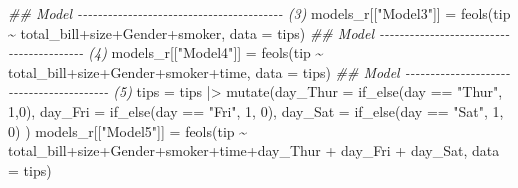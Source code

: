 \documentclass[
  letterpaper,
  DIV=11,
  numbers=noendperiod]{scrreprt}
\newenvironment{Shaded}{\begin{snugshade}}{\end{snugshade}}
\newcommand{\AttributeTok}[1]{\textcolor[rgb]{0.40,0.45,0.13}{#1}}
\newcommand{\DecValTok}[1]{\textcolor[rgb]{0.68,0.00,0.00}{#1}}
\newcommand{\DocumentationTok}[1]{\textcolor[rgb]{0.37,0.37,0.37}{\textit{#1}}}
\newcommand{\FunctionTok}[1]{\textcolor[rgb]{0.28,0.35,0.67}{#1}}
\newcommand{\NormalTok}[1]{\textcolor[rgb]{0.00,0.23,0.31}{#1}}
\newcommand{\OtherTok}[1]{\textcolor[rgb]{0.00,0.23,0.31}{#1}}
\newcommand{\SpecialCharTok}[1]{\textcolor[rgb]{0.37,0.37,0.37}{#1}}
\newcommand{\StringTok}[1]{\textcolor[rgb]{0.13,0.47,0.30}{#1}}
\begin{document}
\begin{Shaded}
\begin{Highlighting}[]
 \DocumentationTok{\#\# Model {-}{-}{-}{-}{-}{-}{-}{-}{-}{-}{-}{-}{-}{-}{-}{-}{-}{-}{-}{-}{-}{-}{-}{-}{-}{-}{-}{-}{-}{-}{-}{-}{-}{-}{-}{-}{-}{-}{-}{-}{-} (3)}
\NormalTok{models\_r[[}\StringTok{"Model3"}\NormalTok{]] }\OtherTok{=} \FunctionTok{feols}\NormalTok{(tip }\SpecialCharTok{\textasciitilde{}}\NormalTok{ total\_bill}\SpecialCharTok{+}\NormalTok{size}\SpecialCharTok{+}\NormalTok{Gender}\SpecialCharTok{+}\NormalTok{smoker, }\AttributeTok{data =}\NormalTok{ tips)}
\DocumentationTok{\#\# Model {-}{-}{-}{-}{-}{-}{-}{-}{-}{-}{-}{-}{-}{-}{-}{-}{-}{-}{-}{-}{-}{-}{-}{-}{-}{-}{-}{-}{-}{-}{-}{-}{-}{-}{-}{-}{-}{-}{-}{-}{-} (4)}
\NormalTok{models\_r[[}\StringTok{"Model4"}\NormalTok{]] }\OtherTok{=} \FunctionTok{feols}\NormalTok{(tip }\SpecialCharTok{\textasciitilde{}}\NormalTok{ total\_bill}\SpecialCharTok{+}\NormalTok{size}\SpecialCharTok{+}\NormalTok{Gender}\SpecialCharTok{+}\NormalTok{smoker}\SpecialCharTok{+}\NormalTok{time, }\AttributeTok{data =}\NormalTok{ tips)}
\DocumentationTok{\#\# Model {-}{-}{-}{-}{-}{-}{-}{-}{-}{-}{-}{-}{-}{-}{-}{-}{-}{-}{-}{-}{-}{-}{-}{-}{-}{-}{-}{-}{-}{-}{-}{-}{-}{-}{-}{-}{-}{-}{-}{-}{-} (5)}
\NormalTok{tips }\OtherTok{=}\NormalTok{ tips }\SpecialCharTok{|\textgreater{}} 
  \FunctionTok{mutate}\NormalTok{(}\AttributeTok{day\_Thur =} \FunctionTok{if\_else}\NormalTok{(day }\SpecialCharTok{==} \StringTok{"Thur"}\NormalTok{, }\DecValTok{1}\NormalTok{,}\DecValTok{0}\NormalTok{),}
        \AttributeTok{day\_Fri =} \FunctionTok{if\_else}\NormalTok{(day }\SpecialCharTok{==} \StringTok{"Fri"}\NormalTok{, }\DecValTok{1}\NormalTok{, }\DecValTok{0}\NormalTok{),}
        \AttributeTok{day\_Sat =} \FunctionTok{if\_else}\NormalTok{(day }\SpecialCharTok{==} \StringTok{"Sat"}\NormalTok{, }\DecValTok{1}\NormalTok{, }\DecValTok{0}\NormalTok{)}
\NormalTok{        )}
\NormalTok{models\_r[[}\StringTok{"Model5"}\NormalTok{]] }\OtherTok{=} \FunctionTok{feols}\NormalTok{(tip }\SpecialCharTok{\textasciitilde{}}\NormalTok{ total\_bill}\SpecialCharTok{+}\NormalTok{size}\SpecialCharTok{+}\NormalTok{Gender}\SpecialCharTok{+}\NormalTok{smoker}\SpecialCharTok{+}\NormalTok{time}\SpecialCharTok{+}\NormalTok{day\_Thur }\SpecialCharTok{+}\NormalTok{ day\_Fri }\SpecialCharTok{+}\NormalTok{ day\_Sat, }\AttributeTok{data =}\NormalTok{ tips)}
\end{Highlighting}
\end{Shaded}
\end{document}
